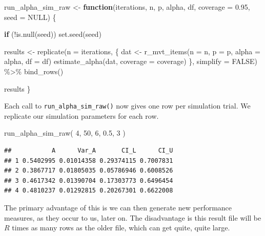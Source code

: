 \documentclass[
]{book}
\newenvironment{Shaded}{\begin{snugshade}}{\end{snugshade}}
\newcommand{\AttributeTok}[1]{\textcolor[rgb]{0.77,0.63,0.00}{#1}}
\newcommand{\ConstantTok}[1]{\textcolor[rgb]{0.00,0.00,0.00}{#1}}
\newcommand{\ControlFlowTok}[1]{\textcolor[rgb]{0.13,0.29,0.53}{\textbf{#1}}}
\newcommand{\DecValTok}[1]{\textcolor[rgb]{0.00,0.00,0.81}{#1}}
\newcommand{\FloatTok}[1]{\textcolor[rgb]{0.00,0.00,0.81}{#1}}
\newcommand{\FunctionTok}[1]{\textcolor[rgb]{0.00,0.00,0.00}{#1}}
\newcommand{\NormalTok}[1]{#1}
\newcommand{\OtherTok}[1]{\textcolor[rgb]{0.56,0.35,0.01}{#1}}
\newcommand{\SpecialCharTok}[1]{\textcolor[rgb]{0.00,0.00,0.00}{#1}}
\begin{document}
\begin{Shaded}
\begin{Highlighting}[]
\NormalTok{run\_alpha\_sim\_raw }\OtherTok{\textless{}{-}} \ControlFlowTok{function}\NormalTok{(iterations, n, p, alpha, df, }\AttributeTok{coverage =} \FloatTok{0.95}\NormalTok{, }\AttributeTok{seed =} \ConstantTok{NULL}\NormalTok{) \{}
  
  \ControlFlowTok{if}\NormalTok{ (}\SpecialCharTok{!}\FunctionTok{is.null}\NormalTok{(seed)) }\FunctionTok{set.seed}\NormalTok{(seed)}
  
\NormalTok{  results }\OtherTok{\textless{}{-}} 
    \FunctionTok{replicate}\NormalTok{(}\AttributeTok{n =}\NormalTok{ iterations, \{}
\NormalTok{      dat }\OtherTok{\textless{}{-}} \FunctionTok{r\_mvt\_items}\NormalTok{(}\AttributeTok{n =}\NormalTok{ n, }\AttributeTok{p =}\NormalTok{ p, }\AttributeTok{alpha =}\NormalTok{ alpha, }\AttributeTok{df =}\NormalTok{ df)}
      \FunctionTok{estimate\_alpha}\NormalTok{(dat, }\AttributeTok{coverage =}\NormalTok{ coverage)}
\NormalTok{    \}, }\AttributeTok{simplify =} \ConstantTok{FALSE}\NormalTok{) }\SpecialCharTok{\%\textgreater{}\%}
    \FunctionTok{bind\_rows}\NormalTok{()}
  
\NormalTok{  results}
\NormalTok{\}}
\end{Highlighting}
\end{Shaded}

Each call to \texttt{run\_alpha\_sim\_raw()} now gives one row per simulation trial.
We replicate our simulation parameters for each row.

\begin{Shaded}
\begin{Highlighting}[]
\FunctionTok{run\_alpha\_sim\_raw}\NormalTok{( }\DecValTok{4}\NormalTok{, }\DecValTok{50}\NormalTok{, }\DecValTok{6}\NormalTok{, }\FloatTok{0.5}\NormalTok{, }\DecValTok{3}\NormalTok{ )}
\end{Highlighting}
\end{Shaded}

\begin{verbatim}
##           A      Var_A       CI_L      CI_U
## 1 0.5402995 0.01014358 0.29374115 0.7007831
## 2 0.3867717 0.01805035 0.05786946 0.6008526
## 3 0.4617342 0.01390704 0.17303773 0.6496454
## 4 0.4810237 0.01292815 0.20267301 0.6622008
\end{verbatim}

The primary advantage of this is we can then generate new performance measures, as they
occur to us, later on. The disadvantage is this result file will be \(R\)
times as many rows as the older file, which can get quite, quite large.
\end{document}
